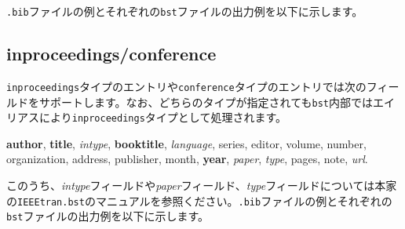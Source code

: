 \documentclass[10pt, a4paper]{jsarticle}
\renewcommand{\refname}{\small 参考文献}
\newcommand{\putlst}[1]{
  \noindent\makebox[\linewidth]{\rule{\linewidth}{0.4pt}}\vspace{-1.5zw}
  \vspace{-1.8zw}
  \noindent\makebox[\linewidth]{\rule{\linewidth}{0.4pt}}\vspace{0.5zw}\par
}
\begin{document}
\texttt{.bib}ファイルの例とそれぞれの\texttt{bst}ファイルの出力例を以下に示します。

\putlst{book.bib}

\begin{bibunit}[IEEJtran]
  \nocite{Book,jpBook1,jpBook2,enBook1}
  \renewcommand{\refname}{\small 参考文献(IEEJtran.bst)}
  {\small \putbib[./book]}
\end{bibunit}
\begin{bibunit}[jIEEEtran]
  \nocite{Book,jpBook1,jpBook2,enBook1}
  \renewcommand{\refname}{\small 参考文献(jIEEEtran.bst)}
  {\small \putbib[./book]}
\end{bibunit}
\begin{bibunit}[IEEJtran]
  \nocite{enjBook1/ej/jpjBook1}
  \renewcommand{\refname}{\small 英日を併記した参考文献(IEEJtran.bst)}
  {\small \putbib[./book]}
\end{bibunit}
\begin{bibunit}[jIEEEtran]
  \nocite{enjBook1/ej/jpjBook1}
  \renewcommand{\refname}{\small 英日を併記した参考文献(jIEEEtran.bst)}
  {\small \putbib[./book]}
\end{bibunit}


\subsection{inproceedings/conference}

\texttt{inproceedings}タイプのエントリや\texttt{conference}タイプのエントリでは次のフィールドをサポートします。なお、どちらのタイプが指定されても\texttt{bst}内部ではエイリアスにより\texttt{inproceedings}タイプとして処理されます。
\begin{center}
  \textbf{author}, \textbf{title}, \textsl{intype}, \textbf{booktitle}, \textsl{language}, series, editor, volume, number, \\
  organization, address, publisher, month, \textbf{year}, \textsl{paper}, \textsl{type}, pages, note, \textsl{url}.
\end{center}
このうち、\textsl{intype}フィールドや\textsl{paper}フィールド、\textsl{type}フィールドについては本家の\texttt{IEEEtran.bst}のマニュアルを参照ください。\texttt{.bib}ファイルの例とそれぞれの\texttt{bst}ファイルの出力例を以下に示します。

\putlst{inproceedings.bib}
\end{document}
